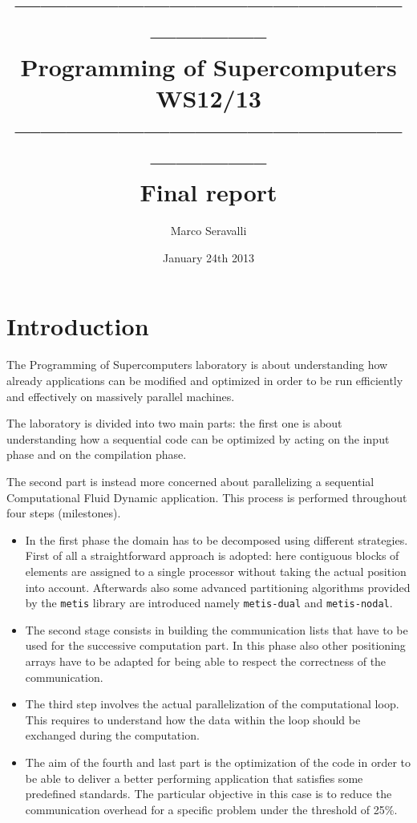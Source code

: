 \documentclass[12pt, a4paper]{article}
\title{----------------------------------------------------------- \\
        {\bf Programming of Supercomputers WS12/13}\\ 
        ----------------------------------------------------------- \\ 
        Final report}
\author{Marco Seravalli}
\date{January 24th 2013}
\begin{document}
  \maketitle

\section{Introduction}
The Programming of Supercomputers laboratory is about understanding how already
applications can be modified and optimized in order to be run efficiently and
effectively on massively parallel machines.

The laboratory is divided into two main parts: the first one is about
understanding how a sequential code can be optimized by acting on the input
phase and on the compilation phase.

The second part is instead more concerned about parallelizing a sequential
Computational Fluid Dynamic application. This process is performed throughout 
four steps (milestones).
\begin{itemize}
  \item In the first phase the domain has to be decomposed using different 
        strategies. First of all a straightforward approach is adopted: here 
        contiguous blocks of elements are assigned to a single processor without
        taking the actual position into account. Afterwards also some advanced
        partitioning algorithms provided by the \verb=metis= library are
        introduced namely \verb=metis-dual= and \verb=metis-nodal=.
  \item The second stage consists in building the communication lists that have 
        to be used for the successive computation part. In this phase also other 
        positioning arrays have to be adapted for being able to respect the 
        correctness of the communication.
  \item The third step involves the actual parallelization of the computational
        loop. This requires to understand how the data within the loop should be
        exchanged during the computation.
  \item The aim of the fourth and last part is the optimization of the code in
        order to be able to deliver a better performing application that
        satisfies some predefined standards. The particular objective in this
        case is to reduce the communication overhead for a specific problem 
        under the threshold of 25\%. 
\end{itemize}
\end{document}
